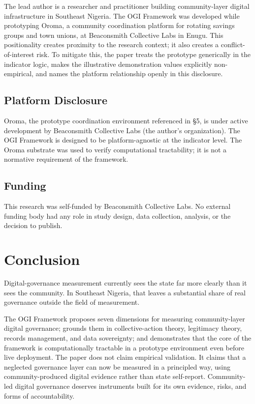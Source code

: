 \documentclass[sigconf]{acmart}
\begin{document}
The lead author is a researcher and practitioner building community-layer digital infrastructure in Southeast Nigeria. The OGI Framework was developed while prototyping Oroma, a community coordination platform for rotating savings groups and town unions, at Beaconsmith Collective Labs in Enugu. This positionality creates proximity to the research context; it also creates a conflict-of-interest risk. To mitigate this, the paper treats the prototype generically in the indicator logic, makes the illustrative demonstration values explicitly non-empirical, and names the platform relationship openly in this disclosure.

\subsection{Platform Disclosure}

Oroma, the prototype coordination environment referenced in \S5, is under active development by Beaconsmith Collective Labs (the author's organization). The OGI Framework is designed to be platform-agnostic at the indicator level. The Oroma substrate was used to verify computational tractability; it is not a normative requirement of the framework.

\subsection{Funding}

This research was self-funded by Beaconsmith Collective Labs. No external funding body had any role in study design, data collection, analysis, or the decision to publish.

\section{Conclusion}

Digital-governance measurement currently sees the state far more clearly than it sees the community. In Southeast Nigeria, that leaves a substantial share of real governance outside the field of measurement.

The OGI Framework proposes seven dimensions for measuring community-layer digital governance; grounds them in collective-action theory, legitimacy theory, records management, and data sovereignty; and demonstrates that the core of the framework is computationally tractable in a prototype environment even before live deployment. The paper does not claim empirical validation. It claims that a neglected governance layer can now be measured in a principled way, using community-produced digital evidence rather than state self-report. Community-led digital governance deserves instruments built for its own evidence, risks, and forms of accountability.
\end{document}

